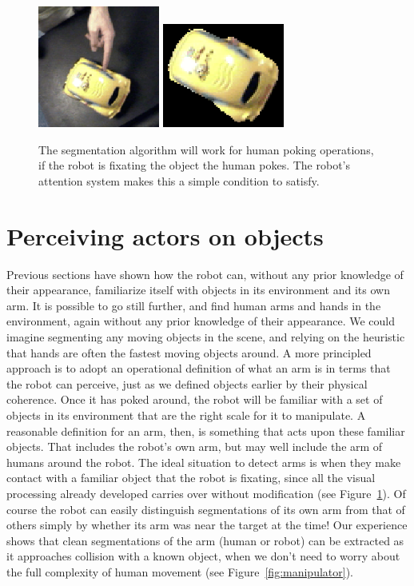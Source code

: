 
\begin{figure}[tbh]
  \centerline{
\includegraphics[width=4cm]{fig-car-hand-seg-src}
\hspace{1cm}
\includegraphics[width=4cm]{fig-car-hand-seg}
}
  \caption{
The segmentation algorithm will work for human poking operations, 
if the robot is fixating the object the human pokes.  The robot's 
attention system makes this a simple condition to satisfy.
}
  \label{fig:hand-poke}
\end{figure}


\section{Perceiving act{\bf ors} on objects}

\label{sect:manipulator}

Previous sections have shown how the robot can, without any prior
knowledge of their appearance, familiarize itself with objects in its
environment and its own arm.  It is possible to go still further, and
find human arms and hands in the environment, again without any prior
knowledge of their appearance.  We could imagine segmenting any moving
objects in the scene, and relying on the heuristic that hands are
often the fastest moving objects around.  A more principled approach
is to adopt an operational definition of what an arm is in terms that
the robot can perceive, just as we defined objects earlier by their
physical coherence.  Once it has poked around, the robot will be
familiar with a set of objects in its environment that are the right
scale for it to manipulate.  A reasonable definition for an arm, then,
is something that acts upon these familiar objects.  That includes the
robot's own arm, but may well include the arm of humans around the
robot. The ideal situation to detect arms is when they make contact
with a familiar object that the robot is fixating, since all the
visual processing already developed carries over without modification
(see Figure~\ref{fig:hand-poke}).  Of course the robot can easily
distinguish segmentations of its own arm from that of others simply by
whether its arm was near the target at the time!  Our experience shows
that clean segmentations of the arm (human or robot) can be extracted
as it approaches collision with a known object, when we don't need to
worry about the full complexity of human movement (see
Figure~\ref{fig:manipulator}).


